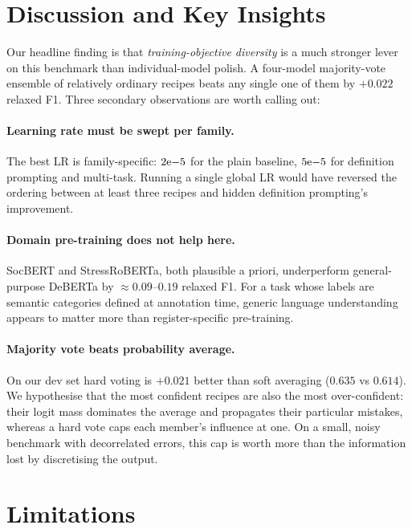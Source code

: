 \documentclass[11pt]{article}
\begin{document}
\section{Discussion and Key Insights}
\label{sec:discussion}

Our headline finding is that \emph{training-objective diversity} is a
much stronger lever on this benchmark than individual-model polish. A
four-model majority-vote ensemble of relatively ordinary recipes beats
any single one of them by $+0.022$ relaxed F1. Three secondary
observations are worth calling out:

\paragraph{Learning rate must be swept per family.} The best LR is
family-specific: $2{\rm e}{-5}$ for the plain baseline, $5{\rm e}{-5}$
for definition prompting and multi-task. Running a single global LR
would have reversed the ordering between at least three recipes and
hidden definition prompting's improvement.

\paragraph{Domain pre-training does not help here.} SocBERT and
StressRoBERTa, both plausible a priori, underperform general-purpose
DeBERTa by $\approx 0.09$--$0.19$ relaxed F1. For a task whose labels
are semantic categories defined at annotation time, generic language
understanding appears to matter more than register-specific pre-training.

\paragraph{Majority vote beats probability average.} On our dev set
hard voting is $+0.021$ better than soft averaging
($0.635$ vs $0.614$). We hypothesise that the most confident recipes
are also the most over-confident: their logit mass dominates the
average and propagates their particular mistakes, whereas a hard vote
caps each member's influence at one. On a small, noisy benchmark with
decorrelated errors, this cap is worth more than the information lost
by discretising the output.

\section{Limitations}
\label{sec:limit}
\end{document}
